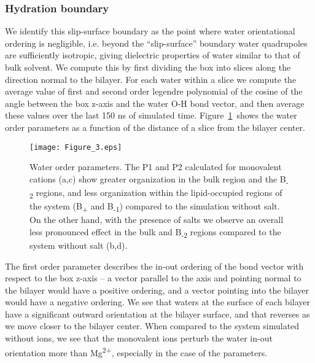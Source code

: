 \subsubsection{Hydration boundary}
We {identify} this 
slip-surface boundary as the point where 
water orientational ordering is negligible, i.e.
beyond the ``slip-surface'' 
boundary water {quadrupoles} are {sufficiently isotropic,
giving dielectric properties of water similar to that of bulk solvent}.
We compute this by first dividing the box into 
slices along the direction normal to the bilayer. 
For each water within a slice we 
compute the average value of first and second order legendre polynomial of 
the cosine of the angle between the box z-axis and
the water O-H bond vector, and then average these values over the last 150 ns of simulated time.
Figure~\ref{figch3:h2order}~shows the water order parameters 
as a function of the distance of a slice from the bilayer center.
\begin{figure}[H]
    \caption[Water orientational order parameters]{Water order parameters.   
        {The P1 and P2 calculated for monovalent cations (a,c) show greater 
            organization in the bulk region and the B\textsubscript{-2} regions, and less organization within 
            the lipid-occupied regions of the system (B\textsubscript{+} and B\textsubscript{-1}) compared to the simulation without salt. 
        } 
{On the other hand, with the presence of \mg salts we observe an overall less pronounced effect in the
bulk and B\textsubscript{-2} regions compared to the system without salt (b,d).}
}
    
    \label{figch3:h2order}
    \texttt{[image: Figure\_3.eps]}
\end{figure}

The first order parameter describes the in-out ordering of the bond vector with respect to the 
box z-axis -- a vector parallel to the axis and pointing normal to the bilayer would have a positive
ordering, and a vector pointing into the bilayer would have a negative ordering. We see that waters at the surface
of each bilayer have a significant outward orientation at the bilayer surface, and that reverses as we move
closer to the bilayer center. When compared to the system simulated without ions, we see that
the monovalent ions perturb the water in-out orientation 
more than Mg\textsuperscript{2+}, especially in the case of the \mgmicro
parameters.

